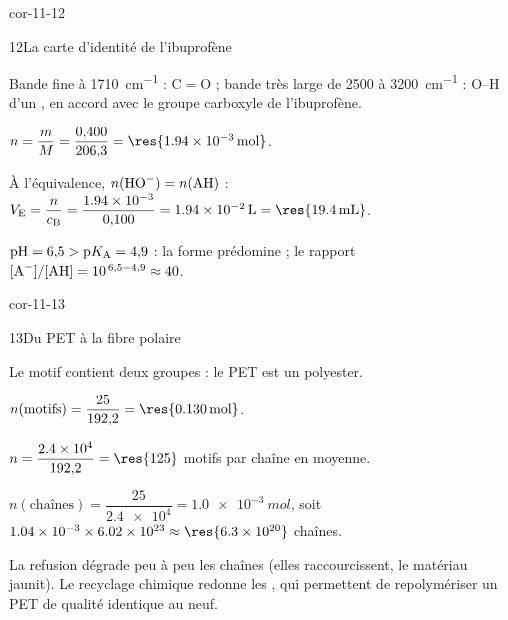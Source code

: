 \begin{blocLivre}{cor-11-12}
\begin{corrige}{12}{La carte d'identité de l'ibuprofène}
\begin{questions}
\item Bande fine à \qty{1710}{cm^{-1}} : C$=$O ; bande très large de 2500 à \qty{3200}{cm^{-1}} : O--H d'un
, en accord avec le groupe carboxyle de l'ibuprofène.
\item $n=\dfrac{m}{M}=\dfrac{0{,}400}{206{,}3}=\res{\qty{1,94e-3}{mol}}$.
\item À l'équivalence, $n(\ce{HO-})=n(\ce{AH})$ :
$V_\mathrm{E}=\dfrac{n}{c_\mathrm{B}}=\dfrac{\num{1.94e-3}}{0{,}100}=\qty{1,94e-2}{L}=\res{\qty{19,4}{mL}}$.
\item $\mathrm{pH}=6{,}5>\mathrm{p}K_{\mathrm{A}}=4{,}9$ : la forme  prédomine ; le rapport
$[\ce{A-}]/[\ce{AH}]=10^{\,6{,}5-4{,}9}\approx40$.
\end{questions}
\end{corrige}
\end{blocLivre}
\begin{blocLivre}{cor-11-13}
\begin{corrige}{13}{Du PET à la fibre polaire}
\begin{questions}
\item Le motif contient deux groupes   : le PET est un polyester.
\item $n(\text{motifs})=\dfrac{25}{192{,}2}=\res{\qty{0,130}{mol}}$.
\item $n=\dfrac{\num{2.4e4}}{192{,}2}=\res{125}$ motifs par chaîne en moyenne.
\item $n(\text{chaînes})=\dfrac{25}{\num{2.4e4}}=\qty{1,0e-3}{mol}$, soit
$\num{1.04e-3}\times\num{6.02e23}\approx\res{\num{6.3e20}}$ chaînes.
\item La refusion dégrade peu à peu les chaînes (elles raccourcissent, le matériau jaunit). Le recyclage chimique
redonne les , qui permettent de repolymériser un PET de qualité identique au neuf.
\end{questions}
\end{corrige}
\end{blocLivre}
